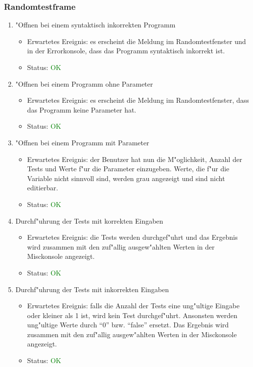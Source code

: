 \subsubsection{Randomtestframe}
\begin{enumerate}
\item "Offnen bei einem syntaktisch inkorrekten Programm
\begin{itemize}
\item Erwartetes Ereignis: es erscheint die Meldung im Randomtestfenster und in der Errorkonsole, dass das Programm syntaktisch inkorrekt ist.
\item Status: \textcolor{green}{OK}
\end{itemize}
\item "Offnen bei einem Programm ohne Parameter
\begin{itemize}
\item Erwartetes Ereignis: es erscheint die Meldung im Randomtestfenster, dass das Programm keine Parameter hat.
\item Status: \textcolor{green}{OK}
\end{itemize}
\item "Offnen bei einem Programm mit Parameter
\begin{itemize}
\item Erwartetes Ereignis: der Benutzer hat nun die M"oglichkeit, Anzahl der Tests und Werte f"ur die Parameter einzugeben. Werte, die f"ur die Variable nicht sinnvoll sind, werden grau angezeigt und sind nicht editierbar.
\item Status: \textcolor{green}{OK}
\end{itemize}
\item Durchf"uhrung der Tests mit korrekten Eingaben
\begin{itemize}
\item Erwartetes Ereignis: die Tests werden durchgef"uhrt und das Ergebnis wird zusammen mit den zuf"allig ausgew"ahlten Werten in der Misckonsole angezeigt.
\item Status: \textcolor{green}{OK}
\end{itemize}
\item Durchf"uhrung der Tests mit inkorrekten Eingaben
\begin{itemize}
\item Erwartetes Ereignis: falls die Anzahl der Tests eine ung"ultige Eingabe oder kleiner als 1 ist, wird kein Test durchgef"uhrt. Ansonsten werden ung"ultige Werte durch "`0"' bzw. "`false"' ersetzt. Das Ergebnis wird zusammen mit den zuf"allig ausgew"ahlten Werten in der Misckonsole angezeigt.
\item Status: \textcolor{green}{OK}
\end{itemize}
\end{enumerate}
